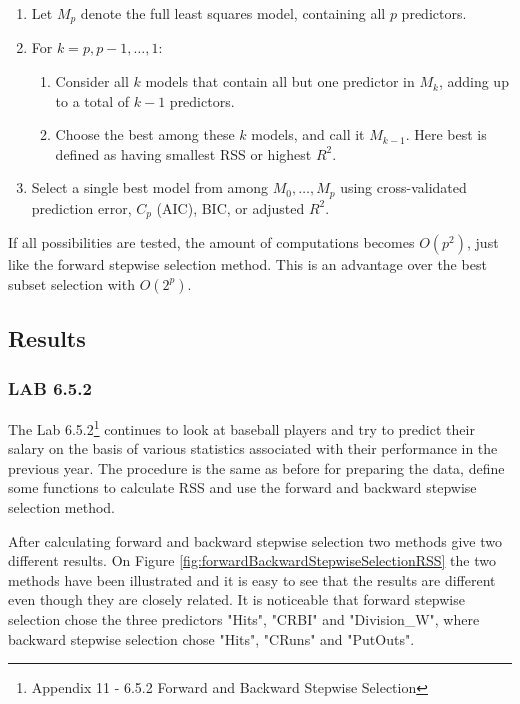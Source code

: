 \begin{enumerate}
	\item Let $M_p$ denote the full least squares model, containing all $p$ predictors.
	\item For $k=p,p-1,\dots,1$:
	\begin{enumerate}
		\item Consider all $k$ models that contain all but one predictor in $M_k$, adding up to a total of $k-1$ predictors.
		\item Choose the best among these $k$ models, and call it $M_{k-1}$. Here best is defined as having smallest RSS or highest $R^2$.
	\end{enumerate}
	\item Select a single best model from among $M_0,\dots,M_p$ using cross-validated prediction error, $C_p$ (AIC), BIC, or adjusted $R^2$. 
\end{enumerate}

If all possibilities are tested, the amount of computations becomes $O(p^2)$, just like the forward stepwise selection method. This is an advantage over the best subset selection with $O(2^p)$.

\subsection{Results}
\subsubsection*{LAB 6.5.2}
The Lab 6.5.2\footnote{Appendix 11 - 6.5.2 Forward and Backward Stepwise Selection} continues to look at baseball players and try to predict their salary on the basis of various statistics associated with their performance in the previous year. The procedure is the same as before for preparing the data, define some functions to calculate RSS and use the forward and backward stepwise selection method.

After calculating forward and backward stepwise selection two methods give two different results. On Figure \ref{fig:forwardBackwardStepwiseSelectionRSS} the two methods have been illustrated and it is easy to see that the results are different even though they are closely related. It is noticeable that forward stepwise selection chose the three predictors "Hits", "CRBI" and "Division\_W", where backward stepwise selection chose "Hits", "CRuns" and "PutOuts".

